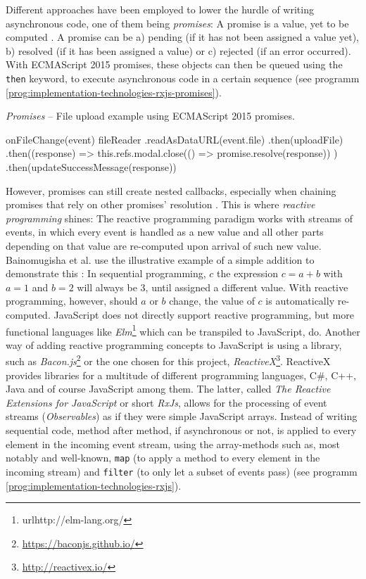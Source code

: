 \noindent Different approaches have been employed to lower the hurdle of writing asynchronous code, one of them being \emph{promises}: A promise is a value, yet to be computed \cite{reactive-vs-promises}. A promise can be a) pending (if it has not been assigned a value yet), b) resolved (if it has been assigned a value) or c) rejected (if an error occurred). With ECMAScript 2015 promises, these objects can then be queued using the \texttt{then} keyword, to execute asynchronous code in a certain sequence (see programm \ref{prog:implementation-technologies-rxjs-promises}).

\begin{program}
\caption{\emph{Promises} -- File upload example using ECMAScript 2015 promises.}
\label{prog:implementation-technologies-rxjs-promises}
\begin{JsCode}
onFileChange(event) {
  fileReader
    .readAsDataURL(event.file)
    .then(uploadFile)
    .then((response) => {
      this.refs.modal.close(() => promise.resolve(response))
    })
    .then(updateSuccessMessage(response))
}
\end{JsCode}
\end{program}

\noindent However, promises can still create nested callbacks, especially when chaining promises that rely on other promises' resolution \cite{reactive-vs-promises}. This is where \emph{reactive programming} shines: The reactive programming paradigm works with streams of events, in which every event is handled as a new value and all other parts depending on that value are re-computed upon arrival of such new value. Bainomugisha et al. use the illustrative example of a simple addition to demonstrate this \cite{reactive-programming-survey}: In sequential programming, $c$ the expression $c = a + b$ with $a = 1$ and $b = 2$ will always be $3$, until assigned a different value. With reactive programming, however, should $a$ or $b$ change, the value of $c$ is automatically re-computed.
JavaScript does not directly support reactive programming, but more functional languages like \emph{Elm}\footnote{url{http://elm-lang.org/}} which can be transpiled to JavaScript, do. Another way of adding reactive programming concepts to JavaScript is using a library, such as \emph{Bacon.js}\footnote{\url{https://baconjs.github.io/}} or the one chosen for this project, \emph{ReactiveX}\footnote{\url{http://reactivex.io/}}. ReactiveX provides libraries for a multitude of different programming languages, C#, C++, Java and of course JavaScript among them. The latter, called \emph{The Reactive Extensions for JavaScript} or short \emph{RxJs}, allows for the processing of event streams (\emph{Observables}) as if they were simple JavaScript arrays. Instead of writing sequential code, method after method, if asynchronous or not, is applied to every element in the incoming event stream, using the array-methods such as, most notably and well-known, \texttt{map} (to apply a method to every element in the incoming stream) and \texttt{filter} (to only let a subset of events pass) (see programm \ref{prog:implementation-technologies-rxjs}).

